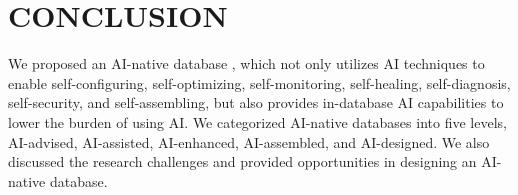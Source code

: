 
\section{CONCLUSION}
\label{sec: conculstion}

We proposed an AI-native database \oursys, which not only utilizes AI techniques to enable self-configuring, self-optimizing, self-monitoring, self-healing, self-diagnosis, self-security, and self-assembling, but also provides in-database AI capabilities to lower the burden of using AI. We categorized AI-native databases into five levels, AI-advised, AI-assisted, AI-enhanced, AI-assembled, and AI-designed. We also discussed the research challenges and provided opportunities in designing an AI-native database.  






